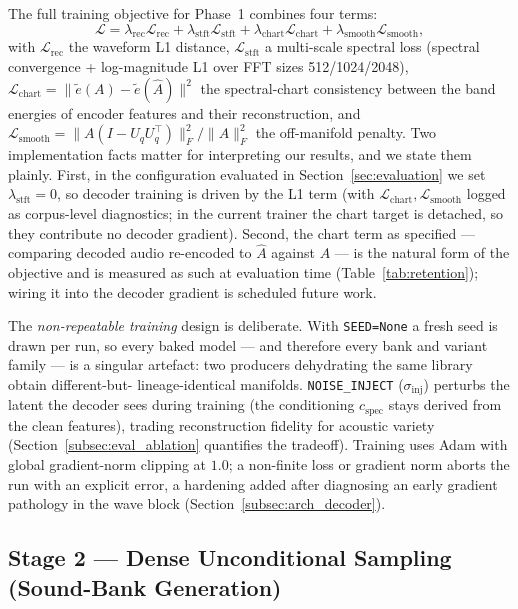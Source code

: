 \documentclass[12pt,a4paper]{article}
\begin{document}
The full training objective for Phase~1 combines four terms:
\begin{equation}
  \mathcal{L}
  = \lambda_{\mathrm{rec}} \mathcal{L}_{\mathrm{rec}}
  + \lambda_{\mathrm{stft}} \mathcal{L}_{\mathrm{stft}}
  + \lambda_{\mathrm{chart}} \mathcal{L}_{\mathrm{chart}}
  + \lambda_{\mathrm{smooth}} \mathcal{L}_{\mathrm{smooth}},
  \label{eq:total_loss}
\end{equation}
with $\mathcal{L}_{\mathrm{rec}}$ the waveform L1 distance,
$\mathcal{L}_{\mathrm{stft}}$ a multi-scale spectral loss (spectral
convergence + log-magnitude L1 over FFT sizes 512/1024/2048),
$\mathcal{L}_{\mathrm{chart}} = \lVert \tilde{e}(A) -
\tilde{e}(\hat{A})\rVert^2$ the spectral-chart consistency between the
band energies of encoder features and their reconstruction, and
$\mathcal{L}_{\mathrm{smooth}} = \lVert A (I - U_q U_q^\top)
\rVert_F^2 / \lVert A \rVert_F^2$ the off-manifold penalty. Two
implementation facts matter for interpreting our results, and we state
them plainly. First, in the configuration evaluated in
Section~\ref{sec:evaluation} we set
$\lambda_{\mathrm{stft}} = 0$, so decoder training is driven by the L1
term (with $\mathcal{L}_{\mathrm{chart}}, \mathcal{L}_{\mathrm{smooth}}$
logged as corpus-level diagnostics; in the current trainer the chart
target is detached, so they contribute no decoder gradient). Second, the
chart term as specified — comparing decoded audio re-encoded to
$\hat{A}$ against $A$ — is the natural form of the objective and is
measured as such at evaluation time (Table~\ref{tab:retention}); wiring
it into the decoder gradient is scheduled future work.

The \emph{non-repeatable training} design is deliberate. With
\texttt{SEED=None} a fresh seed is drawn per run, so every baked model —
and therefore every bank and variant family — is a singular artefact:
two producers dehydrating the same library obtain different-but-
lineage-identical manifolds. \texttt{NOISE\_INJECT} ($\sigma_{\mathrm{inj}}$)
perturbs the latent the decoder sees during training (the conditioning
$c_{\mathrm{spec}}$ stays derived from the clean features), trading
reconstruction fidelity for acoustic variety
(Section~\ref{subsec:eval_ablation} quantifies the tradeoff). Training
uses Adam with global gradient-norm clipping at $1.0$; a non-finite
loss or gradient norm aborts the run with an explicit error, a
hardening added after diagnosing an early gradient pathology in the
wave block (Section~\ref{subsec:arch_decoder}).

\subsection{Stage 2 — Dense Unconditional Sampling (Sound-Bank Generation)}
\label{subsec:stage2}
\end{document}
